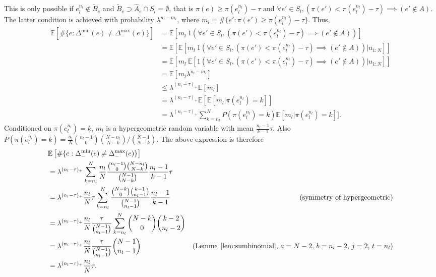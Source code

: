 This is only possible if $e_l^{n_l} \not\in \tilde{B}_e$ and $\tilde{B}_e\supset\hat{A}_e \cap S_l = \emptyset$, that is $\pi(e) \geq \pi(e_l^{n_l}) - \tau$ and $\forall e' \in S_l, (\pi(e') < \pi(e_l^{n_l}) - \tau) \implies (e' \not\in A)$.
The latter condition is achieved with probability $\lambda^{n_l-m_l}$, where $m_l = \#\{e' : \pi(e') \geq \pi(e_l^{n_l})-\tau\}$.
Thus,
\begin{align*}
\mathbb{E}\left[\#\{e : \Delta_-^{\min}(e)\neq\Delta_-^{\max}(e)\}\right]
&= \mathbb{E}[m_l ~ 1(\forall e' \in S_l, (\pi(e') < \pi(e_l^{n_l}) - \tau) \implies (e' \not\in A))]\\
&= \mathbb{E}[\mathbb{E}[m_l ~ 1(\forall e' \in S_l, (\pi(e') < \pi(e_l^{n_l}) - \tau) \implies (e' \not\in A))|u_{1:N}]]\\
&= \mathbb{E}[m_l ~ \mathbb{E}[1(\forall e' \in S_l, (\pi(e') < \pi(e_l^{n_l}) - \tau) \implies (e' \not\in A))|u_{1:N}]]\\
&= \mathbb{E}[m_l \lambda^{n_l-m_l}]\\
&\leq \lambda^{(n_l-\tau)_+} \mathbb{E}[m_l]\\
&= \lambda^{(n_l-\tau)_+} \mathbb{E}[\mathbb{E}[m_l | \pi(e_l^{n_l}) = k]]\\
&= \lambda^{(n_l-\tau)_+} \sum_{k=n_l}^N P(\pi(e_l^{n_l}) = k) \mathbb{E}[m_l | \pi(e_l^{n_l}) = k]].
\end{align*}
Conditioned on $\pi(e_l^{n_l}) = k$, $m_l$ is a hypergeometric random variable with mean $\frac{n_l-1}{k-1}\tau$.
Also $P(\pi(e_l^{n_l}) = k) = \frac{n_l}{N} {n_l-1 \choose 0} {N-n_l \choose N-k} / {N-1 \choose N-k}$.
The above expression is therefore
\begin{align*}
&\mathbb{E}\left[\#\{e : \Delta_-^{\min}(e)\neq\Delta_-^{\max}(e)\}\right]\\
&= \lambda^{(n_l-\tau)_+} \sum_{k=n_l}^N \frac{n_l}{N} \frac{{n_l-1 \choose 0} {N-n_l \choose N-k}}{{N-1 \choose N-k}} \frac{n_l-1}{k-1}\tau\\
&= \lambda^{(n_l-\tau)_+} \frac{n_l}{N} \tau \sum_{k=n_l}^N \frac{{N-k \choose 0} {k-1 \choose n_l-1}}{{N-1 \choose n_l-1}} \frac{n_l-1}{k-1} & \text{(symmetry of hypergeometric)} \\
&= \lambda^{(n_l-\tau)_+} \frac{n_l}{N} \frac{\tau}{{N-1 \choose n_l-1}} \sum_{k=n_l}^N {N-k \choose 0} {k-2 \choose n_l-2} \\
&= \lambda^{(n_l-\tau)_+} \frac{n_l}{N} \frac{\tau}{{N-1 \choose n_l-1}} {N-1 \choose n_l-1} & \text{(Lemma \ref{lem:sumbinomial}, $a=N-2$, $b=n_l-2$, $j=2$, $t=n_l$)} \\
&= \lambda^{(n_l-\tau)_+} \frac{n_l}{N} \tau.
\end{align*}

